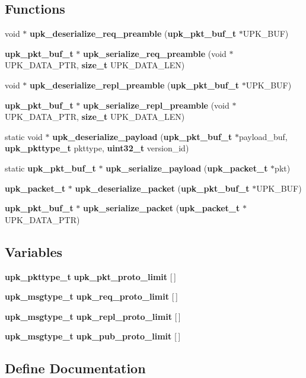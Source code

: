 \subsection*{Functions}
\begin{DoxyCompactItemize}
\item 
void $\ast$ {\bf upk\_\-deserialize\_\-req\_\-preamble} ({\bf upk\_\-pkt\_\-buf\_\-t} $\ast$UPK\_\-BUF)
\item 
{\bf upk\_\-pkt\_\-buf\_\-t} $\ast$ {\bf upk\_\-serialize\_\-req\_\-preamble} (void $\ast$UPK\_\-DATA\_\-PTR, {\bf size\_\-t} UPK\_\-DATA\_\-LEN)
\item 
void $\ast$ {\bf upk\_\-deserialize\_\-repl\_\-preamble} ({\bf upk\_\-pkt\_\-buf\_\-t} $\ast$UPK\_\-BUF)
\item 
{\bf upk\_\-pkt\_\-buf\_\-t} $\ast$ {\bf upk\_\-serialize\_\-repl\_\-preamble} (void $\ast$UPK\_\-DATA\_\-PTR, {\bf size\_\-t} UPK\_\-DATA\_\-LEN)
\item 
static void $\ast$ {\bf upk\_\-deserialize\_\-payload} ({\bf upk\_\-pkt\_\-buf\_\-t} $\ast$payload\_\-buf, {\bf upk\_\-pkttype\_\-t} pkttype, {\bf uint32\_\-t} version\_\-id)
\item 
static {\bf upk\_\-pkt\_\-buf\_\-t} $\ast$ {\bf upk\_\-serialize\_\-payload} ({\bf upk\_\-packet\_\-t} $\ast$pkt)
\item 
{\bf upk\_\-packet\_\-t} $\ast$ {\bf upk\_\-deserialize\_\-packet} ({\bf upk\_\-pkt\_\-buf\_\-t} $\ast$UPK\_\-BUF)
\item 
{\bf upk\_\-pkt\_\-buf\_\-t} $\ast$ {\bf upk\_\-serialize\_\-packet} ({\bf upk\_\-packet\_\-t} $\ast$UPK\_\-DATA\_\-PTR)
\end{DoxyCompactItemize}
\subsection*{Variables}
\begin{DoxyCompactItemize}
\item 
{\bf upk\_\-pkttype\_\-t} {\bf upk\_\-pkt\_\-proto\_\-limit} [$\,$]
\item 
{\bf upk\_\-msgtype\_\-t} {\bf upk\_\-req\_\-proto\_\-limit} [$\,$]
\item 
{\bf upk\_\-msgtype\_\-t} {\bf upk\_\-repl\_\-proto\_\-limit} [$\,$]
\item 
{\bf upk\_\-msgtype\_\-t} {\bf upk\_\-pub\_\-proto\_\-limit} [$\,$]
\end{DoxyCompactItemize}


\subsection{Define Documentation}
